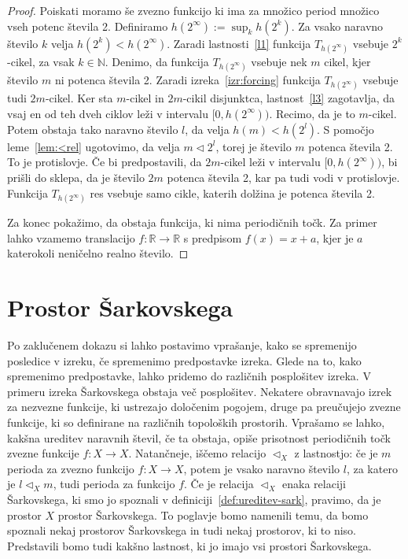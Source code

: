 \documentclass[mat2]{fmfdelo}
\newcommand{\R}{\mathbb R}
\newcommand{\N}{\mathbb N}
\begin{document}
\begin{proof}
Poiskati moramo še zvezno funkcijo ki ima za množico period množico vseh potenc števila 2. Definiramo $h(2^{\infty}) := \sup_k h(2^k)$. Za vsako naravno število $k$ velja $h(2^k) < h(2^{\infty})$. Zaradi lastnosti~\ref{l1} funkcija $T_{h(2^{\infty})}$ vsebuje $2^k$-cikel, za vsak $k \in \N$. 
Denimo, da funkcija $T_{h(2^{\infty})}$ vsebuje nek $m$ cikel, kjer število $m$ ni potenca števila 2. Zaradi izreka~\ref{izr:forcing} funkcija $T_{h(2^{\infty})}$ vsebuje tudi $2m$-cikel. Ker sta $m$-cikel in $2m$-cikil disjunktca, lastnost~\ref{l3} zagotavlja, da vsaj en od teh dveh ciklov leži v intervalu $[0, h(2^{\infty}))$. Recimo, da je to $m$-cikel. Potem obstaja tako naravno število $l$, da velja $h(m) < h(2^l)$. S pomočjo leme~\ref{lem:<rel} ugotovimo, da velja $m \triangleleft 2^l$, torej je število $m$ potenca števila 2. To je protislovje. Če bi predpostavili, da $2m$-cikel leži v intervalu $[0, h(2^{\infty}))$, bi prišli do sklepa, da je število $2m$ potenca števila 2, kar pa tudi vodi v protislovje. Funkcija $T_{h(2^{\infty})}$ res vsebuje samo cikle, katerih dolžina je potenca števila 2.

Za konec pokažimo, da obstaja funkcija, ki nima periodičnih točk. Za primer lahko vzamemo translacijo $f : \R \to \R$ s predpisom $f(x) = x + a$, kjer je $a$ katerokoli neničelno realno število.
\end{proof}

\newpage
\section{Prostor Šarkovskega}
Po zaklučenem dokazu si lahko postavimo vprašanje, kako se spremenijo posledice v izreku, če spremenimo predpostavke izreka. Glede na to, kako spremenimo predpostavke, lahko pridemo do različnih posplošitev izreka. V primeru izreka Šarkovskega obstaja več posplošitev. Nekatere obravnavajo izrek za nezvezne funkcije, ki ustrezajo določenim pogojem, druge pa preučujejo zvezne funkcije, ki so definirane na različnih topoloških prostorih. Vprašamo se lahko, kakšna ureditev naravnih števil, če ta obstaja, opiše prisotnost periodičnih točk zvezne funkcije $f:X \to X$. Natančneje, iščemo relacijo $\triangleleft_X$ z lastnostjo: če je $m$ perioda za zvezno funkcijo $f:X \to X$, potem je vsako naravno število $l$, za katero je $l \triangleleft_X m$, tudi perioda za funkcijo $f$. Če je relacija $\triangleleft_X$ enaka relaciji Šarkovskega, ki smo jo spoznali v definiciji~\ref{def:ureditev-sark}, pravimo, da je prostor $X$ prostor Šarkovskega. To poglavje bomo namenili temu, da bomo spoznali nekaj prostorov Šarkovskega in tudi nekaj prostorov, ki to niso. Predstavili bomo tudi kakšno lastnost, ki jo imajo vsi prostori Šarkovskega. 
\end{document}

